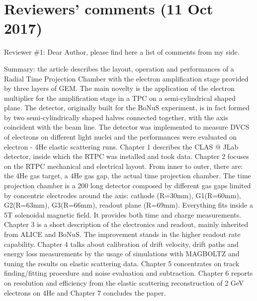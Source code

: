 \documentclass[a4paper,11pt,twoside]{article}
\date{\today}
\begin{document}
\section*{Reviewers' comments (11 Oct 2017)}

Reviewer \#1: Dear Author, please find here a list of comments from my side.

Summary: the article describes the layout, operation and performances of a Radial Time Projection Chamber with the electron amplification stage provided by three layers of GEM. The main novelty is the application of the electron multiplier for the amplification stage in a TPC on a semi-cylindrical shaped plane. The detector, originally built for the BoNuS experiment, is in fact formed by two semi-cylindrically shaped halves connected together, with the axis coincident with the beam line. 
The detector was implemented to measure DVCS of electrons on different light nuclei and the performances were evaluated on electron - 4He elastic scattering runs.
Chapter 1 describes the CLAS @ JLab detector, inside which the RTPC was installed and took data. 
Chapter 2 focuses on the RTPC mechanical and electrical layout. From inner to outer, there are: the 4He gas target, a 4He gas gap, the actual time projection chamber. The time projection chamber is a 200 long detector composed by different gas gaps limited by concentric electrodes around the axis: cathode (R=30mm), G1(R=60mm), G2(R=63mm), G3(R=66mm), readout plane (R=69mm). Everything fits inside a 5T solenoidal magnetic field. It provides both time and charge measurements.
Chapter 3 is a short description of the electronics and readout, mainly inherited from ALICE and BoNuS. The improvement stands in the higher readout rate capability.
Chapter 4 talks about calibration of drift velocity, drift paths and energy loss measurements by the usage of simulations with MAGBOLTZ and tuning the results on elastic scattering data.
Chapter 5 concentrates on track finding/fitting procedure and noise evaluation and subtraction.
Chapter 6 reports on resolution and efficiency from the elastic scattering reconstruction of 2 GeV electrons on 4He and Chapter 7 concludes the paper.
\end{document}
